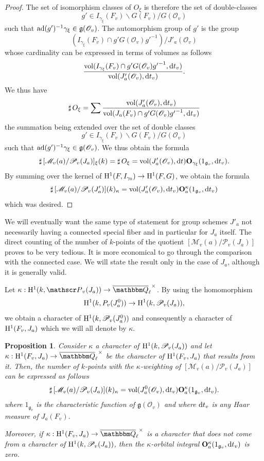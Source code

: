 \documentclass[12pt,english]{smfart}
\numberwithin{equation}{subsection}
\newtheorem{proposition}[equation]{Proposition}
\theoremstyle{remark}
\newcommand\calP{{\mathscr P}}
\newcommand\calM{{\mathscr M}}
\newcommand\calO{{\mathscr O}}
\newcommand\frakg{{\mathfrak g}}
\newcommand\QQ{{\mathbbm Q}}
\newcommand\rmH{{\rm H}}
\newcommand\ad{{\rm ad}}
\newcommand\Ql{{\overline\QQ_\ell}}
\begin{document}
\begin{proof}
The set of isomorphism classes of $O_\xi$ is therefore the set of
double-classes
$$g'\in I_{\gamma_\xi}(F_v)\backslash G(F_v)/G(\calO_v)$$
such that $\ad(g')^{-1} \gamma_\xi\in\frakg(\calO_v)$. The automorphism group
of $g'$ is the group
$$(I_{\gamma_\xi}(F_v)\cap g'G(\calO_v){g'}^{-1}) / J'_a(\calO_v)$$
whose cardinality can be expressed in terms of volumes as follows
$$
\frac{{\rm vol}(I_{\gamma_\xi}(F_v)\cap g'G(\calO_v){g'}^{-1},{\rm d}t_v)}
{{\rm vol}(J'_a(\calO_v),{\rm d}t_v)}.
$$
We thus have
$${\sharp\,} O_\xi= \sum \frac{{\rm vol}(J'_a(\calO_v),{\rm d}t_v)} {{\rm
vol}(J_a(F_v)\cap g'G(\calO_v){g'}^{-1},{\rm d}t_v) }$$ the summation being
extended over the set of double classes
$$g'\in I_{\gamma_\xi}(F_v)\backslash G(F_v)/G(\calO_v)$$
such that $\ad(g')^{-1} \gamma_\xi\in\frakg(\calO_v)$. We thus obtain the
formula
$${\sharp\,} [\calM_v(a)/\calP_v(J_a)]_\xi(k)= {\sharp\,} O_\xi=
{\rm vol}(J'_a(\calO_v),{\rm d}t){\bf O}_{\gamma_\xi}(1_{\frakg_v},{\rm
d}t_v).
$$
By summing over the kernel of $\rmH^1(F,I_{\gamma_0}) \rightarrow
\rmH^1(F,G)$, we obtain the formula
$${\sharp\,} [\calM_v(a)/\calP_v(J'_a)](k)_\kappa=
{\rm vol}(J'_a(\calO_v),{\rm d}t_v){\bf O}^\kappa_a(1_{\frakg_v},{\rm d}t_v)
$$
which was desired.
\end{proof}

We will eventually want the same type of statement for group schemes
$J'_a$ not necessarily having a connected special fiber
and in particular for $J_a$ itself. The direct counting of the
number of $k$-points of the quotient $[\calM_v(a)/\calP_v(J_a)]$ proves
to be very tedious. It is more economical to go through the
comparison with the connected case. We will state the result
only in the case of $J_a$, although it is generally valid.

Let $\kappa:\rmH^1(k,\calP_v(J_a))\rightarrow \Ql^\times$. By using
the homomorphism
$$\rmH^1(k,P_v(J_a^0))\rightarrow
\rmH^1(k,\calP_v(J_a)),
$$
we obtain a character of $\rmH^1(k,\calP_v(J_a^0))$ and consequently a
character of $\rmH^1(F_v,J_a)$ which we will all denote by $\kappa$.

\begin{proposition}\label{comptage avec P_v(J_a)}
Consider $\kappa$ a character of $\rmH^1(k,\calP_v(J_a))$ and
let $\kappa:\rmH^1(F_v,J_a) \rightarrow \Ql^\times$ be the character of
$\rmH^1(F_v,J_a)$ that results from it. Then, the number of $k$-points with
the $\kappa$-weighting of $[\calM_v(a)/\calP_v(J_a)]$ can be expressed
as follows
$$
{\sharp\,} [\calM_v(a)/\calP_v(J_a)](k)_\kappa={\rm vol}(J_a^0(\calO_v),{\rm d}t_v){\bf O}^\kappa_a(1_{\frakg_v},{\rm d}t_v).
$$
where $1_{\frakg_v}$ is the characteristic function of $\frakg(\calO_v)$ and
where ${\rm d}t_v$ is any Haar measure of $J_a(F_v)$.

Moreover, if $\kappa:\rmH^1(F_v,J_a) \rightarrow \Ql^\times$ is a
character that does not come from a character of
$\rmH^1(k,\calP_v(J_a))$, then the $\kappa$-orbital integral ${\bf
O}^\kappa_a(1_{\frakg_v},{\rm d}t_v)$ is zero.
\end{proposition}
\end{document}
